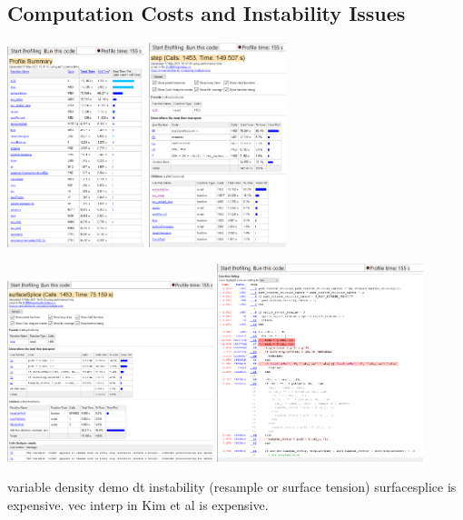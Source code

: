 \documentclass{jfm}
\begin{document}
\subsection {Computation Costs and Instability Issues}
    \begin{center}
        \includegraphics[width=4cm,trim={0mm 0mm 0mm 0mm},clip]{figs/time_profiling/summary.png}
        \includegraphics[width=4cm,trim={0mm 0mm 0mm 0mm},clip]{figs/time_profiling/step.png}
    \end{center}
    \begin{center}
        \includegraphics[width=6cm,trim={0mm 0mm 0mm 0mm},clip]{figs/time_profiling/surfaceSplice.png}
        \includegraphics[width=6cm,trim={0mm 0mm 0mm 0mm},clip]{figs/time_profiling/code.png}
    \end{center}
    variable density
    demo dt instability (resample or surface tension)
    surfacesplice is expensive. vec interp in Kim et al is expensive. 
\end{document}
